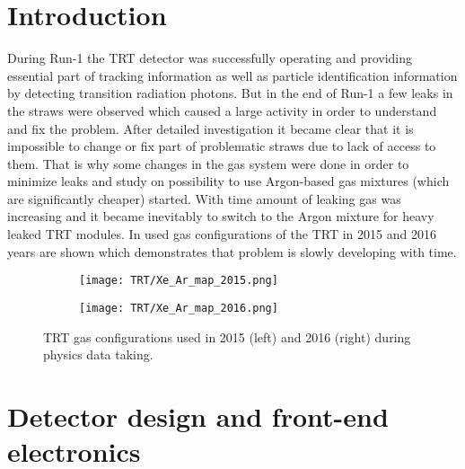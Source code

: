 \section{Introduction}
\label{sec:TRT_intro}

During Run-1 the TRT detector was successfully operating and providing essential part of tracking information 
as well as particle identification information by detecting transition radiation photons. But in the end of Run-1 
a few leaks in the straws were observed which caused a large activity in order to understand and fix the problem. 
After detailed investigation it became clear that it is impossible to change or fix part of problematic straws 
due to lack of access to them. That is why some changes in the gas system were done in order to minimize leaks 
and study on possibility to use Argon-based gas mixtures (which are significantly cheaper) started. 
With time amount of leaking gas was increasing and it became inevitably to switch to the Argon mixture 
for heavy leaked TRT modules. In  used gas configurations of the TRT 
in 2015 and 2016 years are shown which demonstrates that problem is slowly developing with time.

\begin{figure}
\centering
\begin{subfigure}{.5\textwidth}
  \centering
  \texttt{[image: TRT/Xe\_Ar\_map\_2015.png]}
  \label{fig:sub1}
\end{subfigure}%
\begin{subfigure}{.5\textwidth}
  \centering
  \texttt{[image: TRT/Xe\_Ar\_map\_2016.png]}
  \label{fig:sub2}
\end{subfigure}
\caption{TRT gas configurations used in 2015 (left) and 2016 (right) during physics data taking.}
\label{fig:mixed_condition_2015_2016}
\end{figure}

\section{Detector design and front-end electronics}
\label{sec:trt_straw_hw}

